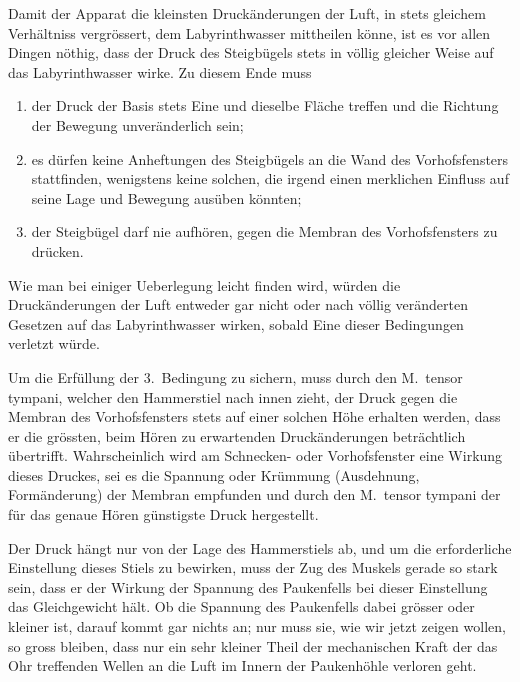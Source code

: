 \documentclass[12pt,a4paper]{article}
\begin{document}
Damit der Apparat die kleinsten Druck\"anderungen der Luft, in stets gleichem Verh\"altniss vergr\"ossert, dem Labyrinthwasser mittheilen k\"onne, ist es vor allen Dingen n\"othig, dass der Druck des Steigb\"ugels stets in v\"ollig gleicher Weise auf das Labyrinthwasser wirke. Zu diesem Ende muss

\begin{enumerate}
\item der Druck der Basis stets Eine und dieselbe Fl\"ache treffen und die Richtung der Bewegung unver\"anderlich sein;
\item es d\"urfen keine Anheftungen des Steigb\"ugels an die Wand des Vorhofsfensters stattfinden, wenigstens keine solchen, die irgend einen merklichen Einfluss auf seine Lage und Bewegung aus\"uben k\"onnten;
\item der Steigb\"ugel darf nie aufh\"oren, gegen die Membran des Vorhofsfensters zu dr\"ucken.
\end{enumerate}

Wie man bei einiger Ueberlegung leicht finden wird, w\"urden die Druck\"anderungen der Luft entweder gar nicht oder nach v\"ollig ver\"anderten Gesetzen auf das Labyrinthwasser wirken, sobald Eine dieser Bedingungen verletzt w\"urde.

Um die Erf\"ullung der 3.\ Bedingung zu sichern, muss durch den M.~tensor tympani, welcher den Hammerstiel nach innen zieht, der Druck gegen die Membran des Vorhofsfensters stets auf einer solchen H\"ohe erhalten werden, dass er die gr\"ossten, beim H\"oren zu erwartenden Druck\"anderungen betr\"achtlich \"ubertrifft. Wahrscheinlich wird am Schnecken- oder Vorhofsfenster eine Wirkung dieses Druckes, sei es die Spannung oder Kr\"ummung (Ausdehnung, Form\"anderung) der Membran empfunden und durch den M.~tensor tympani der f\"ur das genaue H\"oren g\"unstigste Druck hergestellt.

Der Druck h\"angt nur von der Lage des Hammerstiels ab, und um die erforderliche Einstellung dieses Stiels zu bewirken, muss der Zug des Muskels gerade so stark sein, dass er der Wirkung der Spannung des Paukenfells bei dieser Einstellung das Gleichgewicht h\"alt. Ob die Spannung des Paukenfells dabei gr\"osser oder kleiner ist, darauf kommt gar nichts an; nur muss sie, wie wir jetzt zeigen wollen, so gross bleiben, dass nur ein sehr kleiner Theil der mechanischen Kraft der das Ohr treffenden Wellen an die Luft im Innern der Paukenh\"ohle verloren geht.
\end{document}
